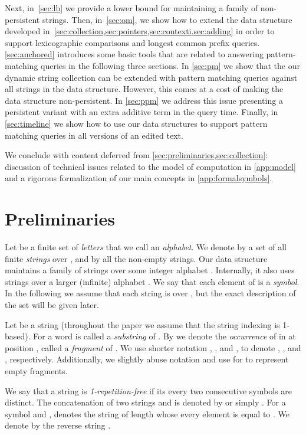 \documentclass[a4paper]{article}
\theoremstyle{remark}
\begin{document}
Next, in~\cref{sec:lb} we provide a lower bound for maintaining a family of non-persistent strings.
Then, in~\cref{sec:om}, we show how to extend the data structure developed in~\cref{sec:collection,sec:pointers,sec:contexti,sec:adding} in order to support lexicographic comparisons and longest common prefix queries.
\cref{sec:anchored} introduces some basic tools that are related to answering pattern-matching queries in the following three sections.
In \cref{sec:pm} we show that the our dynamic string collection can be extended with pattern matching queries against all strings in the data structure.
However, this comes at a cost of making the data structure non-persistent.
In \cref{sec:ppm} we address this issue presenting a persistent variant with an extra additive term in the query time.
Finally, in \cref{sec:timeline} we show how to use our data structures to support pattern matching queries in all versions of an edited text.

We conclude with content deferred from \cref{sec:preliminaries,sec:collection}: 
discussion of technical issues related to the model of computation in \cref{app:model} and a rigorous formalization of our main concepts in \cref{app:formalsymbols}.
\section{Preliminaries}\label{sec:preliminaries}
Let  be a finite set of \emph{letters} that we call an \emph{alphabet}.
We denote by  a set of all finite \emph{strings} over ,
and by  all the non-empty strings.
Our data structure maintains a family of strings over some integer alphabet .
Internally, it also uses strings over a larger (infinite) alphabet .
We say that each element of  is a \emph{symbol}.
In the following we assume that each string is over , but the exact description of the set  will be given later.

Let  be a string (throughout the paper we assume that the string indexing is 1-based).
For  a word  is called a \emph{substring} of .
By  we denote the \emph{occurrence} of  in  at position , called a \emph{fragment} of .
We use shorter notation , , and , to denote , , and , respectively.
Additionally, we slightly abuse notation and use  for  to represent empty fragments. 

We say that a string  is \emph{1-repetition-free} if its every two consecutive symbols are distinct.
The concatenation of two strings  and  is denoted by  or simply .
For a symbol  and ,  denotes the string of length  whose every element is equal to .
We denote by  the reverse string .
\end{document}
